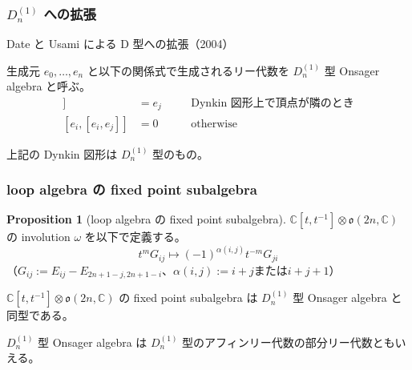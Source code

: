 \documentclass{beamer}
\theoremstyle{definition}
\newtheorem{proposition}{Proposition}
\begin{document}
\begin{frame}
    \frametitle{\(D_n^{(1)}\) への拡張}

    Date と Usami による D 型への拡張（2004）

    \begin{definition}
        生成元 \(e_0, \dots, e_n\) と以下の関係式で生成されるリー代数を \(D_n^{(1)}\) 型 Onsager algebra と呼ぶ。
        \begin{align*}
            [e_i, [e_i, e_j]] & = e_j & \quad & \text{Dynkin 図形上で頂点が隣のとき} \\
            [e_i, [e_i, e_j]] & = 0   & \quad & \text{otherwise}
        \end{align*}

        上記の Dynkin 図形は \(D_n^{(1)}\) 型のもの。

    \end{definition}
\end{frame}

\begin{frame}
    \frametitle{loop algebra の fixed point subalgebra}

    \begin{proposition}[loop algebra の fixed point subalgebra]
        \(\mathbb{C}[t,t^{-1}] \otimes \mathfrak{o}(2n,\mathbb{C})\) の
        involution \(\omega \) を以下で定義する。
        \[
            t^m G_{ij} \mapsto {(-1)}^{\alpha(i,j)} t^{-m} G_{ji}
        \]
        （\(G_{ij} := E_{ij} - E_{2n+1-j,2n+1-i}\)、\(\alpha(i,j) := i+j \text{または} i+j+1\)）

        \(\mathbb{C}[t,t^{-1}] \otimes \mathfrak{o}(2n,\mathbb{C})\) の
        fixed point subalgebra は \(D_n^{(1)}\) 型 Onsager algebra と同型である。
    \end{proposition}

    \(D_n^{(1)}\) 型 Onsager algebra は \(D_n^{(1)}\) 型のアフィンリー代数の部分リー代数ともいえる。
\end{frame}
\end{document}
